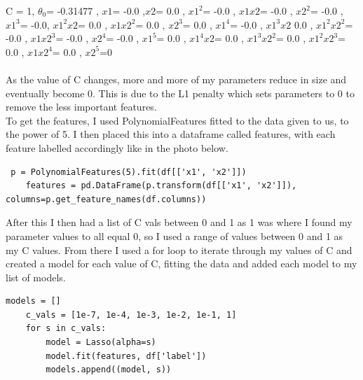 \documentclass[11pt]{article} %
\begin{document}
 C = 1, \(\theta_0\)= -0.31477 , \(x1\)= -0.0 ,\(x2\)= 0.0 , \(x1^2\)= -0.0 , \(x1 x2\)= -0.0 , \(x2^2\)= -0.0 , \(x1^3\)= -0.0, \(x1^2 x2\)= 0.0 , \(x1 x2^2\)= 0.0 , \(x2^3\)= 0.0 , \(x1^4\)= -0.0 , \(x1^3 x2\) 0.0 , \(x1^2 x2^2\)= -0.0 , \(x1 x2^3\)= -0.0 , \(x2^4\)= -0.0 , \(x1^5\)= 0.0 , \(x1^4 x2\)= 0.0 , \(x1^3 x2^2\)= 0.0 , \(x1^2 x2^3\)= 0.0 , \(x1 x2^4\)= 0.0 , \(x2^5\)=0 \\\\


As the value of C changes, more and more of my parameters reduce in size and eventually become 0. This is due to the L1 penalty which sets parameters to 0 to remove the less important features.
\\To get the features, I used PolynomialFeatures fitted to the data given to us, to the power of 5. I then placed this into a dataframe called features, with each feature labelled accordingly like in the photo below.
\begin{verbatim}
 p = PolynomialFeatures(5).fit(df[['x1', 'x2']])
    features = pd.DataFrame(p.transform(df[['x1', 'x2']]), columns=p.get_feature_names(df.columns))
\end{verbatim}
After this I then had a list of C vals between 0 and 1 as 1 was where I found my parameter values to all equal 0, so I used a range of values between 0 and 1 as my C values. From there I used a for loop to iterate through my values of C and created a model for each value of C, fitting the data and added each model to my list of models. 
\begin{verbatim}
models = []
    c_vals = [1e-7, 1e-4, 1e-3, 1e-2, 1e-1, 1]
    for s in c_vals:
        model = Lasso(alpha=s)
        model.fit(features, df['label'])
        models.append((model, s))
\end{verbatim}
\end{document}
